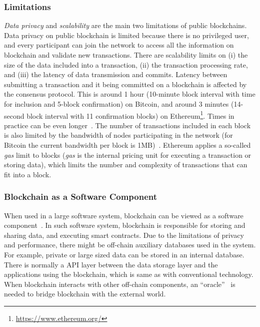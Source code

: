 \subsubsection{Limitations}
\label{sec:limitations}

\textit{Data privacy} and \textit{scalability} are the main two limitations of public blockchains. Data privacy on public blockchain is limited because there is no privileged user, and every participant can join the network to access all the information on blockchain and validate new transactions. There are scalability limits on (i) the size of the data included into a transaction, (ii) the transaction processing rate, and (iii) the latency of data transmission and commits. Latency between submitting a transaction and it being committed on a blockchain is affected by the consensus protocol. This is around 1 hour (10-minute block interval with time for inclusion and 5-block confirmation) on Bitcoin, and around 3 minutes (14-second block interval with 11 confirmation blocks) on Ethereum\footnote{\url{https://www.ethereum.org/}}. Times in practice can be even longer~\cite{SRDS2017}. The number of transactions included in each block is also limited by the bandwidth of nodes participating in the network (for Bitcoin the current bandwidth per block is 1MB)~\cite{blockstack2016}. Ethereum applies a so-called \textit{gas} limit to blocks (\textit{gas} is the internal pricing unit for executing a transaction or storing data), which limits the number and complexity of transactions that can fit into a block. %

\subsubsection{Blockchain as a Software Component}

When used in a large software system, blockchain can be viewed as a software component~\cite{sherry2016}. In such software system, blockchain is responsible for storing and sharing data, and executing smart contracts. Due to the limitations of privacy and performance, there might be off-chain auxiliary databases used in the system. For example, private or large sized data can be stored in an internal database. There is normally a API layer between the data storage layer and the applications using the blockchain, which is same as with conventional technology. When blockchain interacts with other off-chain components, an ``oracle''~\cite{lo2020reliability} is needed to bridge blockchain with the external world.


